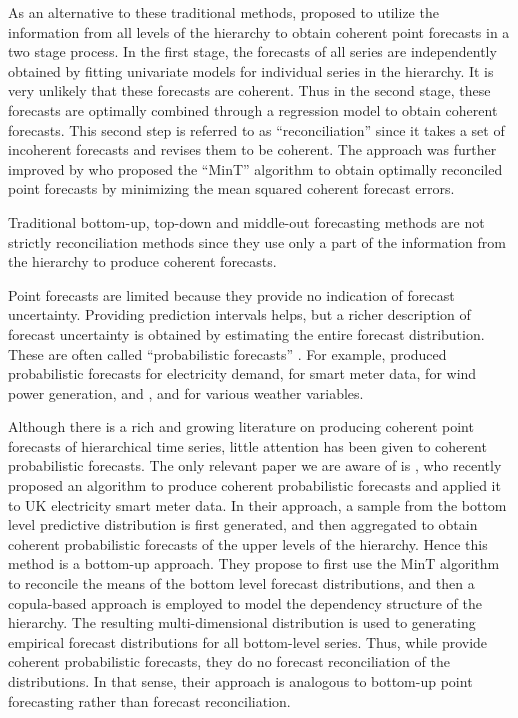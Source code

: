 \documentclass[a4paper, 11pt]{article}
\begin{document}
As an alternative to these traditional methods, \citet{Hyndman2011} proposed to utilize the information from all levels of the hierarchy to obtain coherent point forecasts in  a two stage process. In the first stage, the forecasts of all series are independently obtained by fitting univariate models for individual series in the hierarchy. It is very unlikely that these forecasts are coherent. Thus in the second stage, these forecasts are optimally combined through a regression model to obtain coherent forecasts. This second step is referred to as ``reconciliation'' since it takes a set of incoherent forecasts and revises them to be coherent. The approach was further improved by \citet{Wickramasuriya2017} who proposed the ``MinT'' algorithm to obtain optimally reconciled point forecasts by minimizing the mean squared coherent forecast errors. 

Traditional bottom-up, top-down and middle-out forecasting methods are not strictly reconciliation methods since they use only a part of the information from the hierarchy to produce coherent forecasts. 

Point forecasts are limited because they provide no indication of forecast uncertainty. Providing prediction intervals helps, but a richer description of forecast uncertainty is obtained by estimating the entire forecast distribution. These are often called ``probabilistic forecasts'' \citep{Gneiting2014}. For example, \citet{McSharry2005} produced probabilistic forecasts for electricity demand, \citet{BenTaieb2017} for smart meter data, \citet{Pinson2009} for wind power generation, and \citet{Gel2004}, \citet{Gneiting2005a} and \citet{Gneiting2005} for various weather variables.

Although there is a rich and growing literature on producing coherent point forecasts of hierarchical time series, little  attention has been given to coherent probabilistic forecasts. The only relevant paper we are aware of is \citet{BenTaieb2017}, who recently proposed an algorithm to produce coherent probabilistic forecasts and applied it to UK electricity smart meter data. In their approach, a sample from the bottom level predictive distribution is first generated, and then aggregated to obtain coherent probabilistic forecasts of the upper levels of the hierarchy. Hence this method is a bottom-up approach. They propose to first use the MinT algorithm to reconcile the means of the bottom level forecast distributions, and then a copula-based approach is employed to model the dependency structure of the hierarchy. The resulting multi-dimensional distribution is used to generating empirical forecast distributions for all bottom-level series. Thus, while \citet{BenTaieb2017} provide coherent probabilistic forecasts, they do no forecast reconciliation of the distributions. In that sense, their approach is analogous to bottom-up point forecasting rather than forecast reconciliation.
\end{document}
